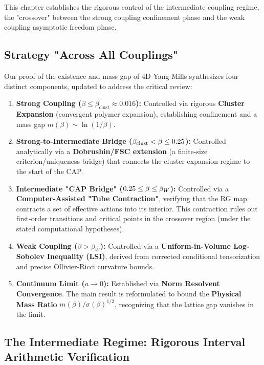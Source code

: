 This chapter establishes the rigorous control of the intermediate coupling regime, the "crossover" between the strong coupling confinement phase and the weak coupling asymptotic freedom phase.

\subsection{Strategy "Across All Couplings"}

Our proof of the existence and mass gap of 4D Yang-Mills synthesizes four distinct components, updated to address the critical review:

\begin{enumerate}
    \item \textbf{Strong Coupling ($\beta \le \beta_{\mathrm{clust}}\approx 0.016$):} Controlled via rigorous \textbf{Cluster Expansion} (convergent polymer expansion), establishing confinement and a mass gap $m(\beta) \sim \ln(1/\beta)$.

    \item \textbf{Strong-to-Intermediate Bridge ($\beta_{\mathrm{clust}} < \beta \le 0.25$):} Controlled analytically via a \textbf{Dobrushin/FSC extension} (a finite-size criterion/uniqueness bridge) that connects the cluster-expansion regime to the start of the CAP.

    \item \textbf{Intermediate "CAP Bridge" ($0.25 \le \beta \le \beta_W$):} Controlled via a \textbf{Computer-Assisted "Tube Contraction"}, verifying that the RG map contracts a set of effective actions into its interior. This contraction rules out first-order transitions and critical points in the crossover region (under the stated computational hypotheses).

    \item \textbf{Weak Coupling ($\beta > \beta_W$):} Controlled via a \textbf{Uniform-in-Volume Log-Sobolev Inequality (LSI)}, derived from corrected conditional tensorization and precise Ollivier-Ricci curvature bounds.

    \item \textbf{Continuum Limit ($a \to 0$):} Established via \textbf{Norm Resolvent Convergence}. The main result is reformulated to bound the \textbf{Physical Mass Ratio} $m(\beta)/\sigma(\beta)^{1/2}$, recognizing that the lattice gap vanishes in the limit.
\end{enumerate}

\subsection{The Intermediate Regime: Rigorous Interval Arithmetic Verification}
\label{sec:cap_verification}

